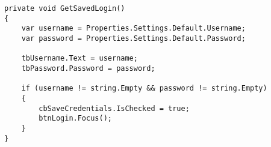 \begin{lstlisting}[style=CSharpstyle]
private void GetSavedLogin()
{
    var username = Properties.Settings.Default.Username;
    var password = Properties.Settings.Default.Password;

    tbUsername.Text = username;
    tbPassword.Password = password;

    if (username != string.Empty && password != string.Empty)
    {
        cbSaveCredentials.IsChecked = true;
        btnLogin.Focus();       
    }
}
\end{lstlisting}

  